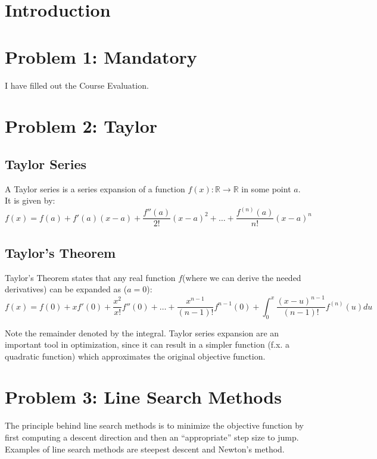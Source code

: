 \documentclass[10pt,oneside,a4paper,final,english]{memoir}
\begin{document}




\maketitle
\newpage

\frontmatter
\tableofcontents
\newpage

\section{Introduction}


\section{Problem 1: Mandatory}
I have filled out the Course Evaluation.


\section{Problem 2: Taylor}
\subsection{Taylor Series}
A Taylor series is a series expansion of a function $f(x) : \mathbb{R}
\rightarrow \mathbb{R}$ in some point $a$. It is given by:
\[ f(x) = f(a) + f'(a)(x-a) + \frac{f''(a)}{2!}(x-a)^2 + \ldots +
\frac{f^{(n)}(a)}{n!}(x-a)^n \]

\subsection{Taylor's Theorem}
Taylor's Theorem states that any real function $f$(where we can derive
the needed derivatives) can be expanded as ($a = 0$):
\[ f(x) = f(0) + x f'(0) + \frac{x^2}{x!}f''(0) + \ldots +
\frac{x^{n-1}}{(n-1)!} f^{n-1}(0) +
\int^x_0{\frac{(x-u)^{n-1}}{(n-1)!}f^{(n)}(u) du}\]

Note the remainder denoted by the integral. Taylor series expansion
are an important tool in optimization, since it can result in a simpler
function (f.x. a quadratic function) which approximates the original
objective function.

\section{Problem 3: Line Search Methods}
The principle behind line search methods is to minimize the objective
function by first computing a descent direction and then an
``appropriate'' step size to jump. Examples of line search methods are
steepest descent and Newton's method.
\end{document}
